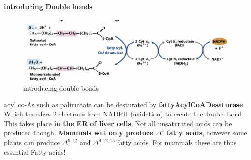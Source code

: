 \documentclass[../main.tex]{subfiles}
\begin{document}
\paragraph{introducing Double bonds}
\begin{figure}[H]
    \centering
    \includegraphics[width=1\linewidth]{DBonds.png}
    \caption{introducing double bonds}
    \label{fig:enter-label}
\end{figure}
acyl co-As such as palimatate can be desturated by \textbf{\gls{fattyAcylCoADesaturase}} Which transfers 2 electrons from NADPH (oxidation) to create the double bond. This takes place \textbf{in the ER of liver cells}. Not all unsaturated acids can be produced though.\textbf{ Mammals will only produce $\Delta^9$ fatty acids}, however some plants can produce $\Delta^{9,12}$ and $\Delta^{9,12,15}$ fatty acids. For mammals these are thus essential Fatty acids!
\end{document}
